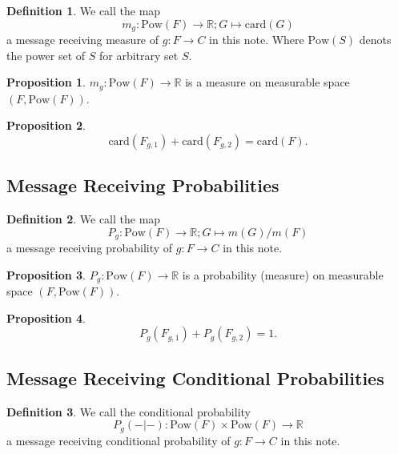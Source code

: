 \documentclass[11pt, a4note]{article}
\theoremstyle{definition}
\newtheorem{definition}{Definition}[section]
\newtheorem{proposition}{Proposition}[section]
\begin{document}
\begin{definition}
We call the map
\begin{equation}
m_{g} : \mathrm{Pow}(F) \to \mathbb{R} ; G \mapsto \mathrm{card}(G)
\end{equation}
a message receiving measure of $ g : F \to C $ in this note.
Where $ \mathrm{Pow}(S) $ denots the power set of $ S $ for arbitrary set $ S $.
\end{definition}

\begin{proposition}
$ m_{g} : \mathrm{Pow}(F) \to \mathbb{R} $ is a measure on measurable space $ (F, \mathrm{Pow}(F)) $.
\end{proposition}

\begin{proposition}
\begin{equation}
\mathrm{card}(F_{g,1}) + \mathrm{card}(F_{g,2}) = \mathrm{card}(F).
\end{equation}
\end{proposition}

\subsection{Message Receiving Probabilities}

\begin{definition}
We call the map
\begin{equation}
P_{g} : \mathrm{Pow}(F) \to \mathbb{R} ; G \mapsto m(G)/m(F)
\end{equation}
a message receiving probability of $ g : F \to C $ in this note.
\end{definition}

\begin{proposition}
$ P_{g} : \mathrm{Pow}(F) \to \mathbb{R} $ is a probability (measure) on measurable space $ (F, \mathrm{Pow}(F)) $.
\end{proposition}

\begin{proposition}
\begin{equation}
P_{g}(F_{g,1}) + P_{g}(F_{g,2}) = 1.
\end{equation}
\end{proposition}

\subsection{Message Receiving Conditional Probabilities}

\begin{definition}
We call the conditional probability 
\begin{equation}
P_{g}(-|-): \mathrm{Pow}(F) \times \mathrm{Pow}(F) \to \mathbb{R}
\end{equation}
a message receiving conditional probability of $ g : F \to C $ in this note.
\end{definition}
\end{document}
